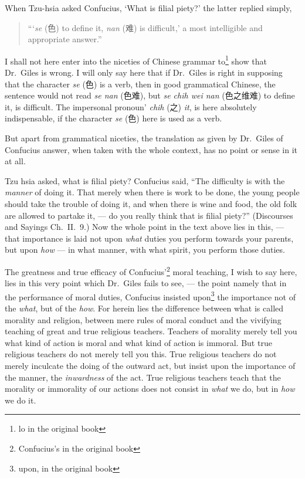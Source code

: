 When Tzu-hsia  asked Confucius, `What is filial piety?' the latter replied simply,
\begin{quote}\footnotesize
``\thinspace`\emph{se} (色) to define it, \emph{nan} (难) is difficult,' a most intelligible and appropriate answer.''
\end{quote}

I shall not here enter into the niceties of Chinese grammar to\footnote{lo in the original book} show that Dr.~Giles is wrong.
I will only say here that if Dr.~Giles is right in supposing that the character \emph{se} (色) is a verb, then in good grammatical Chinese, the sentence would not read \emph{se nan} (色难), but \emph{se chih wei nan} (色之维难) to define it, is difficult.
The impersonal pronoun' \emph{chih} (之) \emph{it}, is here absolutely indispensable, if the character \emph{se} (色) here is used as a verb.

But apart from grammatical niceties, the translation as given by Dr.~Giles of Confucius answer, when taken with the whole context, has no point or sense in it at all.

Tzu hsia asked, what is filial piety?
Confucius said, ``The difficulty is with the \emph{manner}\cite{num25} of doing it. That merely when there is work to be done, the young people should take the trouble of doing it, and when there is wine and food, the old folk are allowed to partake it, --- do you really think that is filial piety?'' (Discourses and Sayings Ch.~II.~9.)
Now the whole point in the text above lies in this, --- that importance is laid not upon \emph{what} duties you perform towards your parents, but upon \emph{how} --- in what manner, with what spirit, you perform those duties.

The greatness and true efficacy of Confucius'\footnote{Confucius's in the original book} moral teaching, I wish to say here, lies in this very point which Dr.~Giles fails to see, --- the point namely that in the performance of moral duties, Confucius insisted upon\footnote{upon, in the original book} the importance not of the \emph{what}, but of the \emph{how}.
For herein lies the difference between what is called morality and religion, between mere rules of moral conduct and the vivifying teaching of great and true religious teachers.
Teachers of morality merely tell you what kind of action is moral and what kind of action is immoral.
But true religious teachers do not merely tell you this.
True religious teachers do not merely inculcate the doing of the outward act, but insist upon the importance of the manner, the \emph{inwardness} of the act.
True religious teachers teach that the morality or immorality of our actions does not consist in \emph{what} we do, but in \emph{how} we do it.

